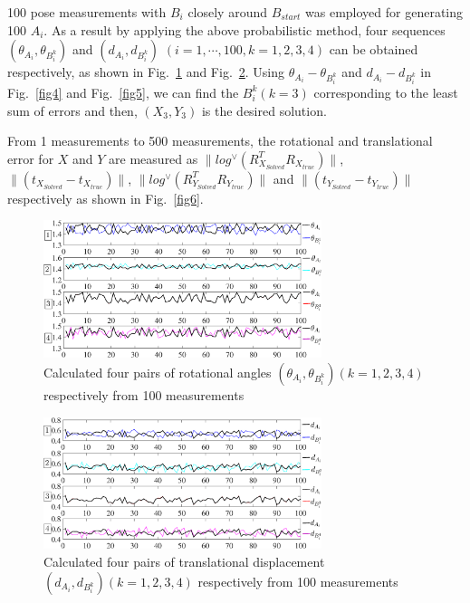 \documentclass[conference,letterpaper]{IEEEtran}
\begin{document}
100 pose measurements with $B_{i}$ closely around $B_{start}$ was employed for generating 100 $A_{i}$. As a result by applying the above probabilistic method, four sequences $(\theta_{A_{i}},\theta_{B_{i}^{k}})$ and $(d_{A_{i}},d_{B_{i}^{k}})$ $ (i=1,\cdots, 100, k=1,2,3,4)$ can be obtained respectively, as shown in Fig.~\ref{fig2} and Fig.~\ref{fig3}. Using $\theta_{A_{i}} - \theta_{B_{i}^{k}}$ and $d_{A_{i}} - d_{B_{i}^{k}}$  in Fig.~\ref{fig4} and Fig.~\ref{fig5}, we can find the ${B_{i}^{k}}(k=3)$  corresponding to the least sum of errors and then, $(X_3,Y_3)$ is the desired solution.

From 1 measurements to 500 measurements, the rotational and translational error for $X$ and $Y$ are measured as  $\parallel log^{\vee} (R_{X_{Solved}}^{T}R_{X_{true}})\parallel$, $\parallel (t_{X_{Solved}}-t_{X_{true}})\parallel$, $\parallel log^{\vee} (R_{Y_{Solved}}^{T}R_{Y_{true}})\parallel$ and $\parallel (t_{Y_{Solved}}-t_{Y_{true}})\parallel$ respectively as shown in Fig.~\ref{fig6}.

\begin{center}
\begin{figure}[htbp]
\centering
\includegraphics[width=3.2in]{fig2.eps}
\caption{
Calculated four pairs of rotational angles $(\theta_{A_{i}},\theta_{B_{i}^{k}}) (k=1,2,3,4)$  respectively from 100 measurements
}
\label{fig2}
\end{figure}
\end{center}

\begin{center}
\begin{figure}[htbp]
\centering
\includegraphics[width=3.2in]{fig3.eps}
\caption{
Calculated four pairs of translational displacement  $(d_{A_{i}},d_{B_{i}^{k}}) (k=1,2,3,4)$  respectively from 100 measurements
}
\label{fig3}
\end{figure}
\end{center}
\end{document}
